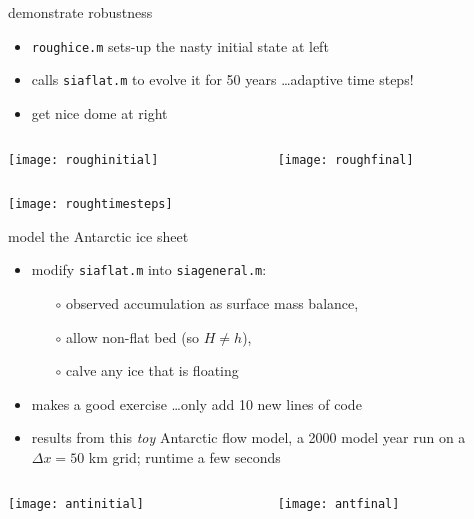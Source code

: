 \begin{frame}{demonstrate robustness}

\begin{itemize}
\item \texttt{roughice.m} sets-up the nasty initial state at left
\item calls \texttt{siaflat.m} to evolve it for 50 years \dots adaptive time steps!
\item get nice dome at right
\end{itemize}

\begin{columns}
\begin{column}{0.5\textwidth}
\texttt{[image: roughinitial]}
\end{column}
\begin{column}{0.5\textwidth}
\hfill \texttt{[image: roughfinal]}
\end{column}
\end{columns}

\vspace{-2mm}
\begin{center}
\texttt{[image: roughtimesteps]}
\end{center}
\end{frame}


\begin{frame}{model the Antarctic ice sheet}

\normalsize
\begin{itemize}
\item modify \texttt{siaflat.m} into \texttt{siageneral.m}:
  \begin{itemize}
  \item[$\circ$] observed accumulation as surface mass balance,
  \item[$\circ$] allow non-flat bed (so $H\ne h$),
  \item[$\circ$] calve any ice that is floating
  \end{itemize}
\item makes a good exercise \dots only add 10 new lines of code
\item results from this \emph{toy} Antarctic flow model, a 2000 model year run on a $\Delta x=50$ km grid; runtime a few seconds
\end{itemize}

\bigskip

\begin{columns}
\begin{column}{0.4\textwidth}
\texttt{[image: antinitial]}
\end{column}
\begin{column}{0.55\textwidth}
\texttt{[image: antfinal]}
\end{column}
\end{columns}
\end{frame}
